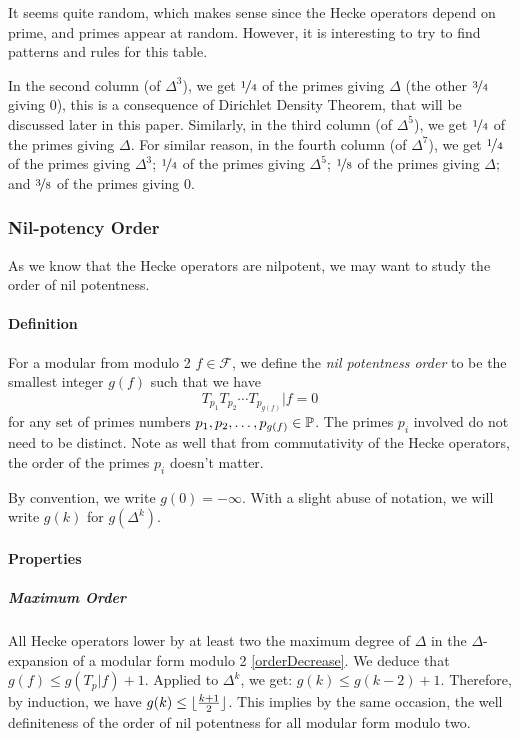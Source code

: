 It seems quite random, which makes sense since the Hecke operators depend on prime, and primes appear at random.
However, it is interesting to try to find patterns and rules for this table.

In the second column (of $\Delta^3$), we get $\nicefrac{1}{4}$ of the primes giving $\Delta$ (the other $\nicefrac{3}{4}$ giving $0$), this is a consequence of Dirichlet Density Theorem, that will be discussed later in this paper.
Similarly, in the third column (of $\Delta^5$), we get $\nicefrac{1}{4}$ of the primes giving $\Delta$.
For similar reason, in the fourth column (of $\Delta^7$), we get $\nicefrac{1}{4}$ of the primes giving $\Delta^3$; $\nicefrac{1}{4}$ of the primes giving $\Delta^5$; $\nicefrac{1}{8}$ of the primes giving $\Delta$; and $\nicefrac{3}{8}$ of the primes giving $0$.



\subsubsection{Nil-potency Order}
As we know that the Hecke operators are nilpotent, we may want to study the order of nil potentness.
\paragraph{Definition}
For a modular from modulo 2 $f \in \mathcal{F}$, we define the \textit{nil potentness order} to be the smallest integer $g(f)$ such that we have 
$$
T_{p_1} T_{p_2} \cdots T_{p_{g(f)}} | f = 0
$$
for any set of primes numbers $p_1, p_2, \dots, p_{g(f)} \in \mathbb{P}$.
The primes $p_i$ involved do not need to be distinct.
Note as well that from commutativity of the Hecke operators, the order of the primes $p_i$ doesn't matter.

By convention, we write $g(0)= -\infty$.
With a slight abuse of notation, we will write $g(k)$ for $g(\Delta^k)$.

\paragraph{Properties}
\subparagraph[Well-definiteness]{Maximum Order}
\label{MaximumOrderNilpotencyHeckeOperators}
All Hecke operators lower by at least two the maximum degree of $\Delta$ in the $\Delta$-expansion of a modular form modulo 2 \ref{orderDecrease}.
We deduce that $g(f) \leq g(T_p|f) + 1$.
Applied to $\Delta^k$, we get: $g(k) \leq g(k-2) + 1$.
Therefore, by induction, we have $g(k) \leq \lfloor \frac{k+1}{2} \rfloor$.
This implies by the same occasion, the well definiteness of the order of nil potentness for all modular form modulo two.

